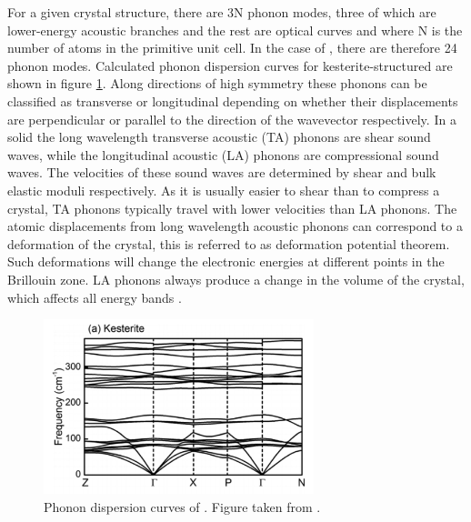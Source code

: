 For a given crystal structure, there are 3N phonon modes, three of which are lower-energy acoustic branches and the rest are optical curves and where N is the number of atoms in the primitive unit cell. In the case of {\CZTS}, there are therefore 24 phonon modes. Calculated phonon dispersion curves for kesterite-structured {\CZTS} are shown in figure \ref{CZTS_phonons}.
Along directions of high symmetry these phonons can be classified as transverse or longitudinal depending on whether their displacements are perpendicular or parallel to the direction of the wavevector respectively. In a solid the long wavelength transverse acoustic (TA) phonons are shear sound waves, while the longitudinal acoustic (LA) phonons are compressional sound waves. The velocities of these sound waves are determined by shear and bulk elastic moduli respectively. As it is usually easier to shear than to compress a crystal, TA phonons typically travel with lower velocities than LA phonons.  
The atomic displacements from long wavelength acoustic phonons can correspond to a deformation of the crystal, this is referred to as deformation potential theorem. Such deformations will change the electronic energies at different points in the Brillouin zone. LA phonons always produce a change in the volume of the crystal, which affects all energy bands \cite{fund_semi}.

\begin{figure}[h!]
  \centering
    \includegraphics[width=0.7\textwidth]{figures/CZTS_phonons.png}
    \caption{Phonon dispersion curves of {\CZTS}.  Figure taken from .}
  \label{CZTS_phonons}
\end{figure}


